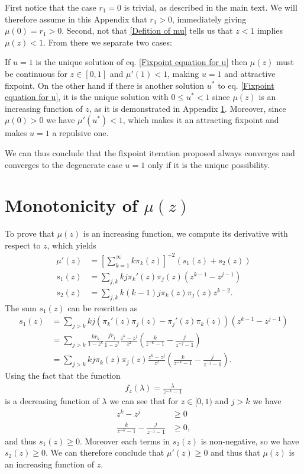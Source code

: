 \documentclass[
11pt, %
english, %
singlespacing, %
nolistspacing, %
liststotoc, %
headsepline, %
]{MastersDoctoralThesis} %
\begin{document}
First notice that the case $r_1 = 0$ is trivial, as described in the main text. We will therefore assume in this Appendix that $r_1 > 0$, immediately giving $\mu(0) = r_1 > 0$. Second, not that \eqref{Defition of mu} tells us that $z < 1$ implies $\mu(z) < 1$. From there we separate two cases:

If $u = 1$ is the unique solution of eq. \eqref{Fixpoint equation for u} then $\mu(z)$ must be continuous for $z \in [0, 1]$ and $\mu'(1) < 1$, making $u = 1$ and attractive fixpoint. On the other hand if there is another solution $u^*$ to eq. \eqref{Fixpoint equation for u}, it is the unique solution with $0 \leq u^* < 1$ since $\mu(z)$ is an increasing function of $z$, as it is demonstrated in Appendix \ref{Appendix: Monotonicity}. Moreover, since $\mu(0) > 0$ we have $\mu'(u^*) < 1$, which makes it an attracting fixpoint and makes $u = 1$ a repulsive one.

We can thus conclude that the fixpoint iteration proposed always converges and converges to the degenerate case $u = 1$ only if it is the unique possibility.

\section{Monotonicity of $\mu(z)$}
\label{Appendix: Monotonicity}

To prove that $\mu(z)$ is an increasing function, we compute its derivative with respect to $z$, which yields
\begin{align}
	\mu'(z) &= \left[\sum_{k = 1}^{\infty}k \pi_k(z)\right]^{-2} \left(s_1(z) + s_2(z)\right) \\
	s_1(z) &= \sum_{j, k}k j \pi_k'(z) \pi_j(z) \left( z^{k-1} -  z^{j-1}\right) \\
	s_2(z) &= \sum_{j, k} k (k - 1) j \pi_k(z) \pi_j(z) z^{k-2}.
\end{align}
The sum $s_1(z)$ can be rewritten as
\begin{align}
	s_1(z) &= \sum_{j > k} k j \left(\pi_k'(z) \pi_j(z) - \pi_j'(z) \pi_k(z)\right) \left(z^{k-1} -  z^{j-1}\right) \\
		&=\sum_{j > k} \frac{k r_k}{1 - z^k} \frac{j r_j}{1 - z^j} \frac{z^k - z^j}{z^2} \left(\frac{k}{z^{-k} - 1} - \frac{j}{z^{-j} - 1}\right)\\
		&=\sum_{j > k} k j \pi_k(z) \pi_j(z) \frac{z^k - z^j}{z^2} \left(\frac{k}{z^{-k} - 1} - \frac{j}{z^{-j} - 1}\right).
\end{align}
Using the fact that the function
\begin{align}
	f_z(\lambda) = \frac{\lambda}{z^{-\lambda} - 1}
\end{align}
is a decreasing function of $\lambda$ we can see that for $z \in [0, 1)$ and $j > k$ we have
\begin{align}
	z^k - z^j &\geq 0 \\
	\frac{k}{z^{-k} - 1} - \frac{j}{z^{-j} - 1} &\geq 0,
\end{align}
and thus $s_1(z) \geq 0$. Moreover each terms in $s_2(z)$ is non-negative, so we have $s_2(z) \geq 0$. We can therefore conclude that $\mu'(z) \geq 0$ and thus that $\mu(z)$ is an increasing function of $z$.
\end{document}

